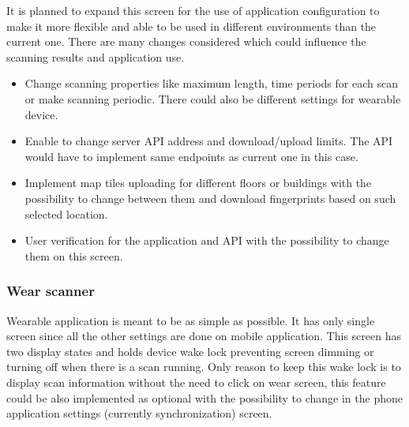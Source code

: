 It is planned to expand this screen for the use of application configuration to make it more flexible and able to be used in different environments than the current one. There are many changes considered which could influence the scanning results and application use.

\begin{itemize}
	\item Change scanning properties like maximum length, time periods for each scan or make scanning periodic. There could also be different settings for wearable device.
	\item Enable to change server API address and download/upload limits. The API would have to implement same endpoints as current one in this case.
	\item Implement map tiles uploading for different floors or buildings with the possibility to change between them and download fingerprints based on such selected location.
	\item User verification for the application and API with the possibility to change them on this screen.
\end{itemize}

\subsubsection{Wear scanner}\label{subsec:WearableScanner}
Wearable application is meant to be as simple as possible. It has only single screen since all the other settings are done on mobile application. This screen has two display states and holds device wake lock preventing screen dimming or turning off when there is a scan running. Only reason to keep this wake lock is to display scan information without the need to click on wear screen, this feature could be also implemented as optional with the possibility to change in the phone application settings (currently synchronization) screen. 

